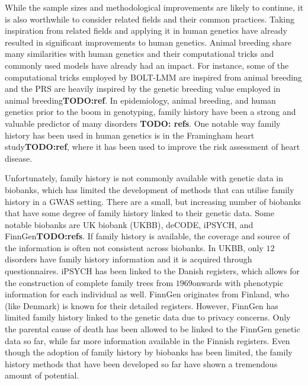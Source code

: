 While the sample sizes and methodological improvements are likely to continue, it is also worthwhile to consider related fields and their common practices. Taking inspiration from related fields and applying it in human genetics have already resulted in significant improvements to human genetics. Animal breeding share many similarities with human genetics and their computational tricks and commonly used models have already had an impact. For instance, some of the computational tricks employed by BOLT-LMM are inspired from animal breeding and the PRS are heavily inspired by the genetic breeding value employed in animal breeding\textbf{TODO:ref}. In epidemiology, animal breeding, and human genetics prior to the boom in genotyping, family history have been a strong and valuable predictor of many disorders \textbf{TODO: refs}. One notable way family history has been used in human genetics is in the Framingham heart study\textbf{TODO:ref}, where it has been used to improve the risk assessment of heart disease.

Unfortunately, family history is not commonly available with genetic data in biobanks, which has limited the development of methods that can utilise family history in a GWAS setting. There are a small, but increasing number of biobanks that have some degree of family history linked to their genetic data. Some notable biobanks are UK biobank (UKBB), deCODE, iPSYCH, and FinnGen\textbf{TODO:refs}. If family history is available, the coverage and source of the information is often not consistent across biobanks. In UKBB, only $ 12 $ disorders have family history information and it is acquired through questionnaires. iPSYCH has been linked to the Danish registers, which allows for the construction of complete family trees from $ 1969 $onwards with phenotypic information for each individual as well. FinnGen originates from Finland, who (like Denmark) is known for their detailed registers. However, FinnGen has limited family history linked to the genetic data due to privacy concerns. Only the parental cause of death has been allowed to be linked to the FinnGen genetic data so far, while far more information available in the Finnish registers. Even though the adoption of family history by biobanks has been limited, the family history methods that have been developed so far have shown a tremendous amount of potential. 

